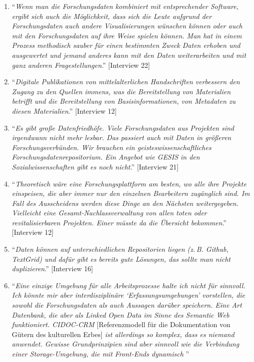 \documentclass[a4paper,
fontsize=11pt,
oneside,
numbers=noperiodatend,
parskip=half-,
bibliography=totoc,
final
]{scrartcl}
\begin{document}
\begin{enumerate}
\item
  \enquote{\emph{Wenn man die Forschungsdaten kombiniert mit
  entsprechender Software, ergibt sich auch die Möglichkeit, dass sich
  die Leute aufgrund der Forschungsdaten auch andere Visualisierungen
  wünschen können oder auch mit den Forschungsdaten auf ihre Weise
  spielen können. Man hat in einem Prozess methodisch sauber für einen
  bestimmten Zweck Daten erhoben und ausgewertet und jemand anderes kann
  mit den Daten weiterarbeiten und mit ganz anderen Fragestellungen}.}
  {[}Interview 22{]}
\item
  \enquote{\emph{Digitale Publikationen von mittelalterlichen
  Handschriften verbessern den Zugang zu den Quellen immens, was die
  Bereitstellung von Materialien betrifft und die Bereitstellung von
  Basisinformationen, von Metadaten zu diesen Materialien}.}
  {[}Interview 12{]}
\item
  \enquote{\emph{Es gibt große Datenfriedhöfe. Viele Forschungsdaten aus
  Projekten sind irgendwann nicht mehr lesbar. Das passiert auch mit
  Daten in größeren Forschungsverbünden. Wir brauchen ein
  geisteswissenschaftliches Forschungsdatenrepositorium. Ein Angebot wie
  GESIS in den Sozialwissenschaften gibt es noch nicht}.} {[}Interview
  21{]}
\item
  \enquote{\emph{Theoretisch wäre eine Forschungsplattform am besten, wo
  alle ihre Projekte einspeisen, die aber immer nur den einzelnen
  Bearbeitern zugänglich sind. Im Fall des Ausscheidens werden diese
  Dinge an den Nächsten weitergegeben. Vielleicht eine
  Gesamt-Nachlassverwaltung von allen toten oder revitalisierbaren
  Projekten. Einer müsste da die Übersicht bekommen}.} {[}Interview
  12{]}
\item
  \enquote{\emph{Daten können auf unterschiedlichen Repositorien liegen
  (z.\,B. Github, TextGrid) und dafür gibt es bereits gute Lösungen, das
  sollte man nicht duplizieren}.} {[}Interview 16{]}
\item
  \enquote{\emph{Eine einzige Umgebung für alle Arbeitsprozesse halte
  ich nicht für sinnvoll. Ich könnte mir aber interdisziplinäre
  \enquote{Erfassungsumgebungen} vorstellen, die sowohl die
  Forschungsdaten als auch Aussagen darüber speichern. Eine Art
  Datenbank, die aber als Linked Open Data im Sinne des Semantic Web
  funktioniert. CIDOC-CRM} {[}Referenzmodell für die Dokumentation von
  Gütern des kulturellen Erbes{]} \emph{ist allerdings so komplex, dass
  es niemand anwendet. Gewisse Grundprinzipien sind aber sinnvoll wie
  die Verbindung einer Storage-Umgebung, die mit Front-Ends dynamisch
}}
\end{enumerate}
\end{document}
